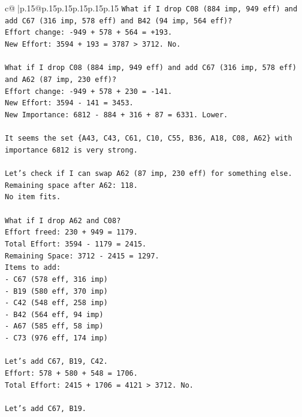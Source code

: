 \documentclass{article}
\begin{document}
{\begin{supertabular}{c@{$\;$}|p{.15\linewidth}@{}p{.15\linewidth}p{.15\linewidth}p{.15\linewidth}p{.15\linewidth}p{.15\linewidth}}
{{{\texttt{What if I drop C08 (884 imp, 949 eff) and add C67 (316 imp, 578 eff) and B42 (94 imp, 564 eff)?} \\
\texttt{Effort change: {-}949 + 578 + 564 = +193.} \\
\texttt{New Effort: 3594 + 193 = 3787 > 3712. No.} \\
\\ 
\texttt{What if I drop C08 (884 imp, 949 eff) and add C67 (316 imp, 578 eff) and A62 (87 imp, 230 eff)?} \\
\texttt{Effort change: {-}949 + 578 + 230 = {-}141.} \\
\texttt{New Effort: 3594 {-} 141 = 3453.} \\
\texttt{New Importance: 6812 {-} 884 + 316 + 87 = 6331. Lower.} \\
\\ 
\texttt{It seems the set \{A43, C43, C61, C10, C55, B36, A18, C08, A62\} with importance 6812 is very strong.} \\
\\ 
\texttt{Let's check if I can swap A62 (87 imp, 230 eff) for something else.} \\
\texttt{Remaining space after A62: 118.} \\
\texttt{No item fits.} \\
\\ 
\texttt{What if I drop A62 and C08?} \\
\texttt{Effort freed: 230 + 949 = 1179.} \\
\texttt{Total Effort: 3594 {-} 1179 = 2415.} \\
\texttt{Remaining Space: 3712 {-} 2415 = 1297.} \\
\texttt{Items to add:} \\
\texttt{{-} C67 (578 eff, 316 imp)} \\
\texttt{{-} B19 (580 eff, 370 imp)} \\
\texttt{{-} C42 (548 eff, 258 imp)} \\
\texttt{{-} B42 (564 eff, 94 imp)} \\
\texttt{{-} A67 (585 eff, 58 imp)} \\
\texttt{{-} C73 (976 eff, 174 imp)} \\
\\ 
\texttt{Let's add C67, B19, C42.} \\
\texttt{Effort: 578 + 580 + 548 = 1706.} \\
\texttt{Total Effort: 2415 + 1706 = 4121 > 3712. No.} \\
\\ 
\texttt{Let's add C67, B19.} \\
}}}
\end{supertabular}}
\end{document}

